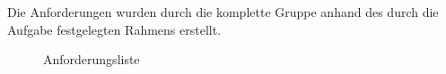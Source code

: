 \documentclass[conference]{IEEEtran}
\begin{document}
\par Die Anforderungen wurden durch die komplette Gruppe anhand des durch die Aufgabe festgelegten Rahmens erstellt.

\begin{figure}[h] 
\caption{Anforderungsliste }
\label{fig.1}
\end{figure}
\end{document}
